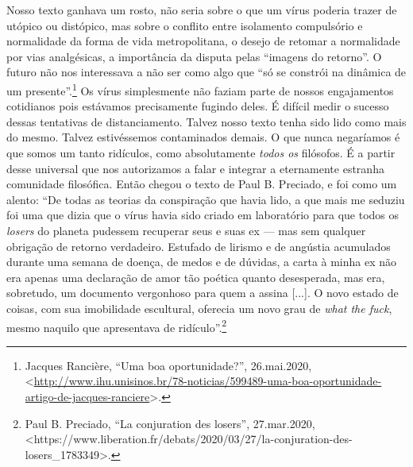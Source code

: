 Nosso texto ganhava um rosto, não seria sobre o que um vírus poderia
trazer de utópico ou distópico, mas sobre o conflito entre isolamento
compulsório e normalidade da forma de vida metropolitana, o desejo de
retomar a normalidade por vias analgésicas, a importância da disputa
pelas ``imagens do retorno''. O futuro não nos interessava a não ser
como algo que ``só se constrói na dinâmica de um presente''.\footnote{Jacques
  Rancière, ``Uma boa oportunidade?'', 26.mai.2020,
  \textless{}{\url{http://www.ihu.unisinos.br/78-noticias/599489-uma-boa-oportunidade-artigo-de-jacques-ranciere}\textgreater{}.}}
Os vírus simplesmente não faziam parte de nossos engajamentos cotidianos
pois estávamos precisamente fugindo deles. É difícil medir o sucesso
dessas tentativas de distanciamento. Talvez nosso texto tenha sido lido
como mais do mesmo. Talvez estivéssemos contaminados demais. O que nunca
negaríamos é que somos um tanto ridículos, como absolutamente
\emph{todos os} filósofos. É a partir desse universal que nos
autorizamos a falar e integrar a eternamente estranha comunidade
filosófica. Então chegou o texto de Paul B. Preciado, e foi como um
alento: ``De todas as teorias da conspiração que havia lido, a que mais
me seduziu foi uma que dizia que o vírus havia sido criado em
laboratório para que todos os \emph{losers} do planeta pudessem
recuperar seus e suas ex --- mas sem qualquer obrigação de retorno
verdadeiro. Estufado de lirismo e de angústia acumulados durante uma
semana de doença, de medos e de dúvidas, a carta à minha ex não era
apenas uma declaração de amor tão poética quanto desesperada, mas era,
sobretudo, um documento vergonhoso para quem a assina {[}...{]}. O novo
estado de coisas, com sua imobilidade escultural, oferecia um novo grau
de \emph{what the fuck}, mesmo naquilo que apresentava de
ridículo''.\footnote{Paul B. Preciado, ``La conjuration des losers'',
  27.mar.2020,
  \textless{}https://www.liberation.fr/debats/2020/03/27/la-conjuration-des-losers\_1783349{\textgreater{}.}}

